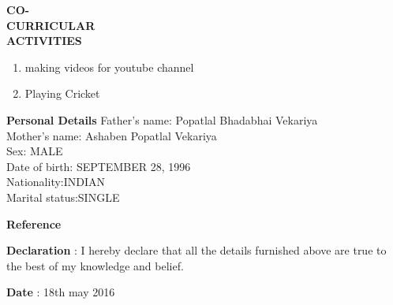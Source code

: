 \documentclass{article}
\begin{document}
  \begin{flushleft} 
  	\vspace{0.4in}
  	\textbf{CO- \\CURRICULAR \\ACTIVITIES }
  	\begin{enumerate}
  		\vspace{-0.65in}
  		\addtolength{\itemindent}{1.359in}
  		\item  making videos for youtube channel 
  		\item  Playing Cricket
  		
  	\end{enumerate}
  \end{flushleft}
  

\begin{flushleft}
	\vspace{0.4in}
	\textbf{Personal Details} \hspace{0.36in}Father's name: \hspace{0.13in} Popatlal Bhadabhai Vekariya  \\
	\hspace{1.55in}Mother's name: \hspace{0.08in} Ashaben Popatlal Vekariya \\
	\hspace{1.55in}Sex:\hspace{0.85in} MALE\\
	\hspace{1.55in}Date of birth:\hspace{0.255in} SEPTEMBER 28, 1996	\\
	\hspace{1.55in}Nationality:\hspace{0.45in}INDIAN\\
	\hspace{1.55in}Marital status:\hspace{0.28in}SINGLE
	
\end{flushleft}     


\begin{flushleft}
	\vspace{0.4in}
	\textbf{Reference} \hspace{0.75in} 
\end{flushleft}

\begin{flushleft}
	\vspace{0.2in}
	\textbf{Declaration} \hspace{0.60in} : I hereby declare that all the details furnished above are true to the best of
	my knowledge and belief.
\end{flushleft}

\begin{flushleft}
	\vspace{0.2in}
	\textbf{Date} : 18th may 2016
\end{flushleft}
\end{document}
